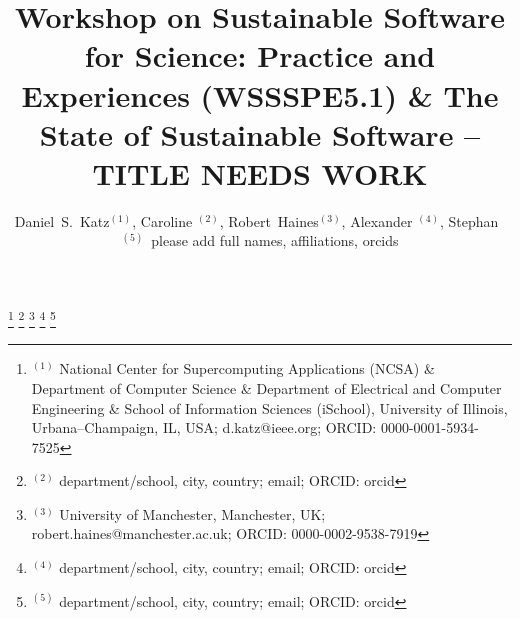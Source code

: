 \documentclass[11pt, oneside]{amsart}
\begin{document}
\title[]{Workshop on Sustainable Software for Science: Practice and Experiences (WSSSPE5.1) \& The State of Sustainable Software -- TITLE NEEDS WORK}

\author{Daniel~S.~Katz$^{(1)}$,
Caroline $^{(2)}$,
Robert~Haines$^{(3)}$,
Alexander $^{(4)}$,
Stephan\ $^{(5)}$\
please add full names, affiliations, orcids
}

%
\thanks{{}$^{(1)}$ National Center for Supercomputing Applications (NCSA) \&
Department of Computer Science  \&
Department of Electrical and Computer Engineering  \&
School of Information Sciences (iSchool),
University of Illinois, Urbana--Champaign, IL, USA; d.katz@ieee.org; ORCID: 0000-0001-5934-7525}
%
\thanks{{}$^{(2)}$ department/school, city, country; email; ORCID: orcid}
%
\thanks{{}$^{(3)}$ University of Manchester, Manchester, UK; robert.haines@manchester.ac.uk; ORCID: 0000-0002-9538-7919}
%
\thanks{{}$^{(4)}$ department/school, city, country; email; ORCID: orcid}
%
\thanks{{}$^{(5)}$ department/school, city, country; email; ORCID: orcid}
%
\end{document}
